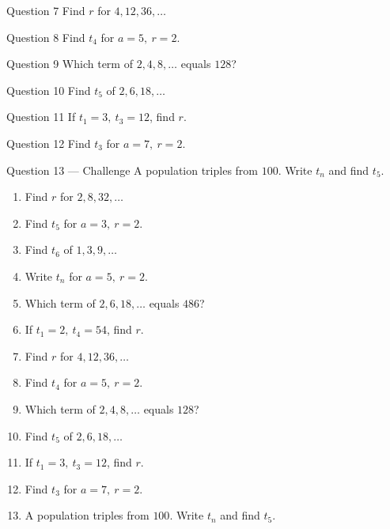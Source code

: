 \documentclass[11pt]{article}
\begin{document}
\begin{qbox}{Question 7}
Find $r$ for $4,12,36,\dots$\workspace{2.4cm}
\end{qbox}

\begin{qbox}{Question 8}
Find $t_4$ for $a=5,\ r=2$.\workspace{2.4cm}
\end{qbox}

\begin{qbox}{Question 9}
Which term of $2,4,8,\dots$ equals $128$?\workspace{2.4cm}
\end{qbox}

\begin{qbox}{Question 10}
Find $t_5$ of $2,6,18,\dots$\workspace{2.4cm}
\end{qbox}

\begin{qbox}{Question 11}
If $t_1=3,\ t_3=12$, find $r$.\workspace{2.4cm}
\end{qbox}

\begin{qbox}{Question 12}
Find $t_3$ for $a=7,\ r=2$.\workspace{2.4cm}
\end{qbox}

\begin{qbox}{Question 13 --- Challenge}
A population triples from $100$. Write $t_n$ and find $t_5$.\workspace{3cm}
\end{qbox}

\clearpage
{}

\begin{recapbox}
\begin{multicols}{2}
\small
\begin{enumerate}[leftmargin=*,itemsep=3pt]
  \item Find $r$ for $2,8,32,\dots$
  \item Find $t_5$ for $a=3,\ r=2$.
  \item Find $t_6$ of $1,3,9,\dots$
  \item Write $t_n$ for $a=5,\ r=2$.
  \item Which term of $2,6,18,\dots$ equals $486$?
  \item If $t_1=2,\ t_4=54$, find $r$.
  \item Find $r$ for $4,12,36,\dots$
  \item Find $t_4$ for $a=5,\ r=2$.
  \item Which term of $2,4,8,\dots$ equals $128$?
  \item Find $t_5$ of $2,6,18,\dots$
  \item If $t_1=3,\ t_3=12$, find $r$.
  \item Find $t_3$ for $a=7,\ r=2$.
  \item A population triples from $100$. Write $t_n$ and find $t_5$.
\end{enumerate}
\end{multicols}
\end{recapbox}
\end{document}
